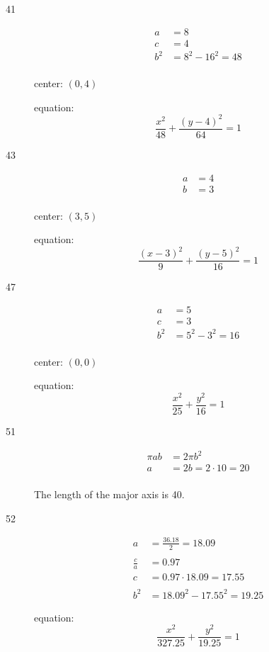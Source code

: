 \documentclass[fleqn,addpoints]{exam}
\begin{document}
\begin{description}
\item[41]
\begin{align*}
  a &= 8 \\
  c &= 4 \\
  b^2 &= 8^2 - 16^2 = 48 \\
\end{align*}

center: $(0, 4)$

equation:
\[
  \frac{x^2}{48} + \frac{(y-4)^2}{64} = 1
\]

\item[43]

\begin{align*}
  a &= 4 \\
  b &= 3 \\
\end{align*}

center: $(3, 5)$

equation:
\[
  \frac{(x-3)^2}{9} + \frac{(y-5)^2}{16} = 1
\]

\item[47]

\begin{align*}
  a &= 5 \\
  c &= 3 \\
  b^2 &= 5^2 - 3^2 = 16 \\
\end{align*}

center: $(0, 0)$

equation:
\[
  \frac{x^2}{25} + \frac{y^2}{16} = 1
\]

\item[51]
\begin{align*}
  \pi ab &= 2 \pi b^2 \\
  a &= 2b = 2 \cdot 10 = 20 \\
\end{align*}

The length of the major axis is 40.

\item[52]
\begin{align*}
  a &= \frac{36.18}{2} = 18.09 \\
  \\
  \frac{c}{a} &= 0.97 \\
  c &= 0.97 \cdot 18.09 =  17.55 \\
  \\
  b^2 &= 18.09^2 - 17.55^2 = 19.25
\end{align*}

equation:
\[
  \frac{x^2}{327.25} + \frac{y^2}{19.25} = 1
\]


\end{description}
\end{document}
